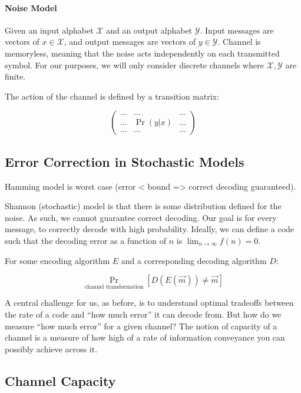 \documentclass{idc_msc}
\begin{document}
\paragraph{Noise Model}

Given an input alphabet \(\mathcal{X}\) and an output alphabet \(\mathcal{Y}\).
Input messages are vectors of \(x \in \mathcal{X}\), and output messages are vectors of \(y \in \mathcal{Y}\).
Channel is memoryless, meaning that the noise acts independently on each transmitted symbol.
For our purposes, we will only consider discrete channels where \(\mathcal{X}, \mathcal{Y}\) are finite.

The action of the channel is defined by a transition matrix:

\[
  \begin{pmatrix}
    \ldots & \ldots & \ldots \\
    \ldots & \Pr(y | x) & \ldots \\
    \ldots & \ldots & \ldots
  \end{pmatrix}
\]

\subsection{Error Correction in Stochastic Models}

Hamming model is worst case (error < bound => correct decoding guaranteed).

Shannon (stochastic) model is that there is some distribution defined for the noise.
As such, we cannot guarantee correct decoding.
Our goal is for every message, to correctly decode with high probability.
Ideally, we can define a code such that the decoding error as a function of \(n\) is \(\lim_{n \to \infty} f(n) = 0\).

For some encoding algorithm \(E\) and a corresponding decoding algorithm \(D\):

\[
\Pr_{\text{channel transformation}}[D(E(\vec{m})) \ne \vec{m}]
\]

A central challenge for us, as before, is to understand optimal tradeoffs between the rate of a code and ``how much error'' it can decode from.
But how do we measure ``how much error'' for a given channel?
The notion of capacity of a channel is a measure of how high of a rate of information conveyance you can possibly achieve across it.

\subsection{Channel Capacity}
\end{document}
